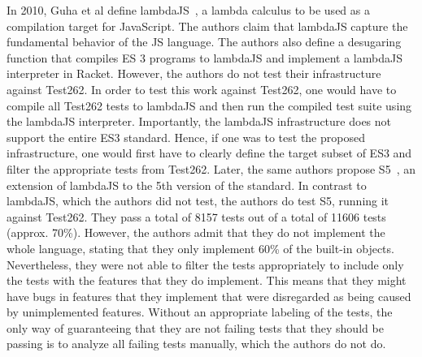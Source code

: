 \documentclass[runningheads]{llncs}
\begin{document}
In 2010, Guha et al define lambdaJS~\cite{essence_javascript-2010}, a lambda calculus to be used as a compilation target for JavaScript. The authors claim that lambdaJS capture the fundamental behavior of the JS language. The authors also define a desugaring function that compiles ES 3 programs to lambdaJS and implement a lambdaJS interpreter in Racket. However, the authors do not test their infrastructure against Test262. In order to test this work against Test262, one would have to compile all Test262 tests to lambdaJS and then run the compiled test suite using the lambdaJS interpreter. Importantly, the lambdaJS infrastructure does not support the entire ES3 standard. Hence, if one was to test the proposed infrastructure, one would first have to clearly define the target subset of ES3 and filter the appropriate tests from Test262. Later, the same authors propose S5~\cite{Politz-2012}, an extension of lambdaJS to the 5th version of the standard. In contrast to lambdaJS, which the authors did not test, the authors do test S5, running it against Test262. They pass a total of 8157 tests out of a total of 11606 tests (approx. 70\%). However, the authors admit that they do not implement the whole language, stating that they only implement 60\% of the built-in objects. Nevertheless, they were not able to filter the tests appropriately to include only the tests with the features that they do implement. This means that they might have bugs in features that they implement that were disregarded as being caused by unimplemented features. Without an appropriate labeling of the tests, the only way of guaranteeing that they are not failing tests that they should be passing is to analyze all failing tests manually, which the authors do not do.
\end{document}
